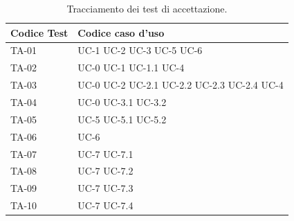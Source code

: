 \documentclass[8pt]{article}
\begin{document}
\begin{longtable}{|>{\centering}p{4cm}|>{\centering\arraybackslash}p{4cm}|}
\hline
\rowcolor{white}
\textbf{Codice Test} & \textbf{Codice caso d'uso} \\
\hline
\endfirsthead
\rowcolor{white}
\caption{Tracciamento dei test di accettazione.}
\label{table:Tracciamento dei test di accettazione}
\endlastfoot
    TA-01 & UC-1 \newline
    UC-2 \newline
    UC-3 \newline
    UC-5 \newline
    UC-6 \newline
    \\
    \hline
    TA-02 & UC-0 \newline
            UC-1 \newline
            UC-1.1 \newline
            UC-4
    \\
    \hline 
    TA-03 & UC-0 \newline
            UC-2 \newline
            UC-2.1 \newline
            UC-2.2 \newline
            UC-2.3 \newline
            UC-2.4 \newline
            UC-4
    \\
    \hline
    TA-04 & UC-0 \newline
            UC-3.1 \newline
            UC-3.2
    \\
    \hline
    TA-05 & UC-5 \newline
            UC-5.1\newline
            UC-5.2
    \\
    \hline
    TA-06 & UC-6 \\
    \hline
    TA-07 & UC-7 \newline
            UC-7.1
    \\
    \hline
    TA-08 & UC-7 \newline
    UC-7.2
    \\
    \hline
    TA-09 & UC-7 \newline
    UC-7.3
    \\
    \hline
    TA-10 & UC-7 \newline
    UC-7.4
    \\
    \hline
\end{longtable}
\clearpage
\end{document}
